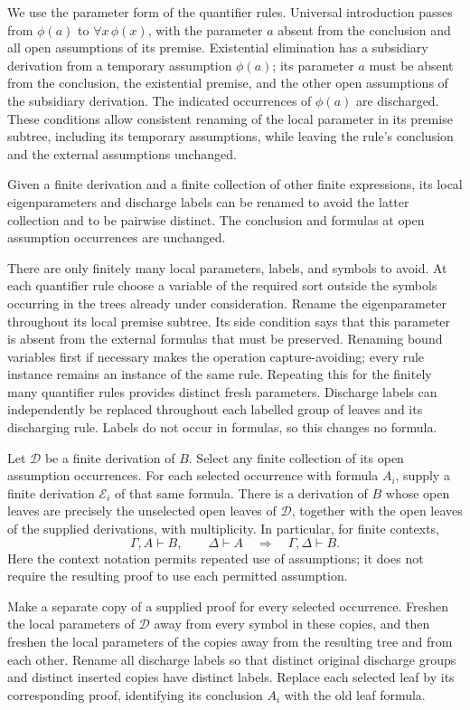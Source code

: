 We use the parameter form of the quantifier rules. Universal introduction
passes from $\phi(a)$ to $\forall x\,\phi(x)$, with the parameter $a$
absent from the conclusion and all open assumptions of its premise.
Existential elimination has a subsidiary derivation from a temporary
assumption $\phi(a)$; its parameter $a$ must be absent from the conclusion,
the existential premise, and the other open assumptions of the subsidiary
derivation. The indicated occurrences of $\phi(a)$ are discharged.
These conditions allow consistent renaming of the local parameter in its
premise subtree, including its temporary assumptions, while leaving the
rule's conclusion and the external assumptions unchanged.

\begin{lemma}
Given a finite derivation and a finite collection of other finite
expressions, its local eigenparameters and discharge labels can be
renamed to avoid the latter collection and to be pairwise distinct.
The conclusion and formulas at open assumption occurrences are unchanged.
\end{lemma}
\Proof
There are only finitely many local parameters, labels, and symbols to
avoid. At each quantifier rule choose a variable of the required sort
outside the symbols occurring in the trees already under consideration.
Rename the eigenparameter throughout its local premise subtree. Its side
condition says that this parameter is absent from the external formulas
that must be preserved. Renaming bound variables first if necessary makes
the operation capture-avoiding; every rule instance remains an instance
of the same rule. Repeating this for the finitely many quantifier rules
provides distinct fresh parameters. Discharge labels can independently
be replaced throughout each labelled group of leaves and its discharging
rule. Labels do not occur in formulas, so this changes no formula.
\Done

\begin{theorem}
Let $\mathcal D$ be a finite derivation of $B$. Select any finite
collection of its open assumption occurrences. For each selected
occurrence with formula $A_i$, supply a finite derivation $\mathcal E_i$
of that same formula. There is a derivation of $B$ whose open leaves
are precisely the unselected open leaves of $\mathcal D$, together
with the open leaves of the supplied derivations, with multiplicity.
In particular, for finite contexts,
\[
\Gamma,A\vdash B,\qquad\Delta\vdash A
\quad\Longrightarrow\quad\Gamma,\Delta\vdash B.
\]
Here the context notation permits repeated use of assumptions; it does
not require the resulting proof to use each permitted assumption.
\end{theorem}
\Proof
Make a separate copy of a supplied proof for every selected occurrence.
Freshen the local parameters of $\mathcal D$ away from every symbol in
these copies, and then freshen the local parameters of the copies away
from the resulting tree and from each other. Rename all discharge labels
so that distinct original discharge groups and distinct inserted copies
have distinct labels. Replace each selected leaf by its corresponding
proof, identifying its conclusion $A_i$ with the old leaf formula.

